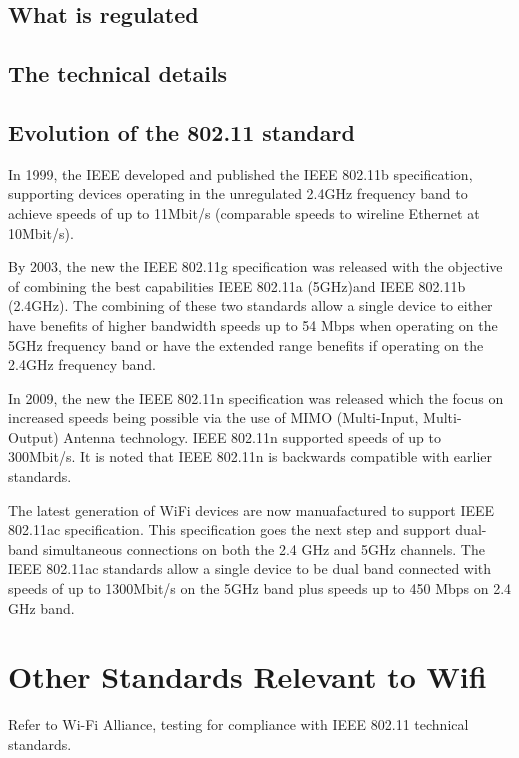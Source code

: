 \subsection{What is regulated}

\subsection{The technical details}

\subsection{Evolution of the 802.11 standard}

In 1999, the IEEE developed and published the IEEE 802.11b specification, supporting devices operating in the unregulated 2.4GHz frequency band to achieve speeds of up to 11Mbit/s (comparable speeds to wireline Ethernet at 10Mbit/s).

By 2003, the new the IEEE 802.11g specification was released with the objective of combining the best capabilities IEEE 802.11a (5GHz)and IEEE 802.11b (2.4GHz). The combining of these two standards allow a single device to either have benefits of higher bandwidth speeds up to 54 Mbps when operating on the 5GHz frequency band or have the extended range benefits if operating on the 2.4GHz frequency band. 

In 2009, the new the IEEE 802.11n specification was released which the focus on increased speeds being possible via the use of MIMO (Multi-Input, Multi-Output) Antenna technology. IEEE 802.11n supported speeds of up to 300Mbit/s. It is noted that IEEE 802.11n is backwards compatible with earlier standards.

The latest generation of WiFi devices are now manuafactured to support IEEE 802.11ac specification.  This specification goes the next step and support dual-band simultaneous connections on both the 2.4 GHz and 5GHz channels. The IEEE 802.11ac standards allow a single device to be dual band connected with speeds of up to 1300Mbit/s on the 5GHz band plus speeds up to 450 Mbps on 2.4 GHz band.



\section{Other Standards Relevant to Wifi}

Refer to Wi-Fi Alliance, testing for compliance with IEEE 802.11 technical standards.